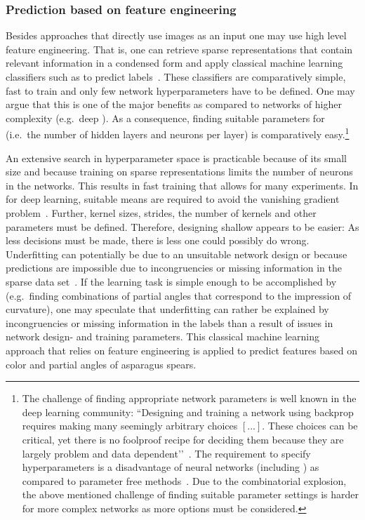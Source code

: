 \subsubsection{Prediction based on feature engineering}
\label{subsec:FeatureEngineering}

Besides approaches that directly use images as an input one may use high level feature engineering. That is, one can retrieve sparse representations that contain relevant information in a condensed form and apply classical machine learning classifiers such as  to predict labels~\citep{zheng2018feature}. These classifiers are comparatively simple, fast to train and only few network hyperparameters have to be defined. One may argue that this is one of the major benefits as compared to networks of higher complexity (e.g.\ deep ). As a consequence, finding suitable parameters for  (i.e.\ the number of hidden layers and neurons per layer) is comparatively easy.\footnote{The challenge of finding appropriate network parameters is well known in the deep learning community: ``Designing and training a network using backprop requires making many seemingly arbitrary choices $[...]$. These choices can be critical, yet there is no foolproof recipe for deciding them because they are largely problem and data dependent’’~\citep[p.~9]{lecun2012efficient}. The requirement to specify hyperparameters is a disadvantage of neural networks (including ) as compared to parameter free methods~\citep{scikit2019neural}. Due to the combinatorial explosion, the above mentioned challenge of finding suitable parameter settings is harder for more complex networks as more options must be considered.}

An extensive search in hyperparameter space is practicable because of its small size and because training on sparse representations limits the number of neurons in the networks. This results in fast training that allows for many experiments. In  for deep learning, suitable means are required to avoid the vanishing gradient problem~\citep{wang2019vanishing}. Further, kernel sizes, strides, the number of kernels and other parameters must be defined. Therefore, designing shallow  appears to be easier: As less decisions must be made, there is less one could possibly do wrong. Underfitting can potentially be due to an unsuitable network design or because predictions are impossible due to incongruencies or missing information in the sparse data set~\citep{lecun2012efficient}. If the learning task is simple enough to be accomplished by  (e.g.\ finding combinations of partial angles that correspond to the impression of curvature), one may speculate that underfitting can rather be explained by incongruencies or missing information in the labels than a result of issues in network design- and training parameters. This classical machine learning approach that relies on feature engineering is applied to predict features based on color and partial angles of asparagus spears.

